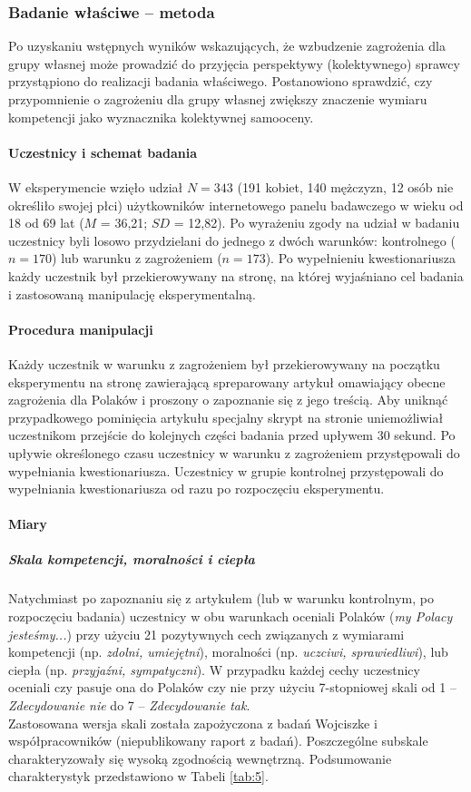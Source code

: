 \documentclass[man]{apa6}
\begin{document}
\subsubsection{Badanie właściwe -- metoda}

Po uzyskaniu wstępnych wyników wskazujących, że wzbudzenie zagrożenia dla grupy własnej może prowadzić do przyjęcia  perspektywy (kolektywnego) sprawcy przystąpiono do realizacji badania właściwego. Postanowiono sprawdzić, czy przypomnienie o zagrożeniu dla grupy własnej zwiększy znaczenie wymiaru kompetencji jako wyznacznika kolektywnej samooceny.

\paragraph{Uczestnicy i schemat badania}
W eksperymencie wzięło udział $N=343$ (191 kobiet, 140 mężczyzn, 12 osób nie określiło swojej płci) użytkowników internetowego panelu badawczego w wieku od 18 od 69 lat ($M$ = 36,21; $SD$ = 12,82). Po wyrażeniu zgody na udział w badaniu uczestnicy byli losowo przydzielani do jednego z dwóch warunków: kontrolnego ($n = 170$) lub warunku z zagrożeniem ($n = 173$). Po wypełnieniu kwestionariusza każdy uczestnik był przekierowywany na stronę, na której wyjaśniano cel badania i zastosowaną manipulację eksperymentalną.

\paragraph{Procedura manipulacji}
Każdy uczestnik w warunku z zagrożeniem był przekierowywany na początku eksperymentu na stronę zawierającą spreparowany artykuł omawiający obecne zagrożenia dla Polaków i proszony o zapoznanie się z jego treścią. Aby uniknąć przypadkowego pominięcia artykułu specjalny skrypt na stronie uniemożliwiał uczestnikom przejście do kolejnych części badania przed upływem 30 sekund. Po upływie określonego czasu uczestnicy w warunku z zagrożeniem przystępowali do wypełniania kwestionariusza. Uczestnicy w grupie kontrolnej przystępowali do wypełniania kwestionariusza od razu po rozpoczęciu eksperymentu. \\

\paragraph{Miary}
\subparagraph{Skala kompetencji, moralności i ciepła}
Natychmiast po zapoznaniu się z artykułem (lub w warunku kontrolnym, po rozpoczęciu badania) uczestnicy w obu warunkach oceniali Polaków (\emph{my Polacy jesteśmy...}) przy użyciu 21 pozytywnych cech związanych z wymiarami kompetencji (np. \emph{zdolni, umiejętni}), moralności (np. \emph{uczciwi, sprawiedliwi}), lub ciepła (np. \emph{przyjaźni, sympatyczni}). W przypadku każdej cechy uczestnicy oceniali czy pasuje ona do Polaków czy nie przy użyciu 7-stopniowej skali od 1 -- \emph{Zdecydowanie nie} do 7 -- \emph{Zdecydowanie tak}.\\
Zastosowana wersja skali została zapożyczona z badań Wojciszke i współpracowników (niepublikowany raport z badań). Poszczególne subskale charakteryzowały się wysoką zgodnością wewnętrzną. Podsumowanie charakterystyk przedstawiono w Tabeli \ref{tab:5}.
\end{document}

